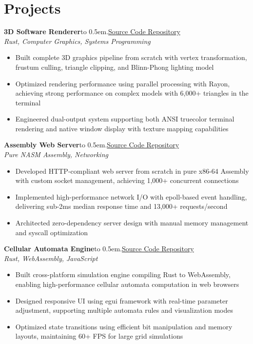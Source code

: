\documentclass[a4paper,10pt]{article}
\newcommand{\projentry}[2]{
  \noindent\textbf{#1}\leaders\hbox to 0.5em{\hss.\hss}\hfill{#2}\\[-0.25em]
}
\begin{document}
\section{Projects}
\projentry{3D Software Renderer}{\href{https://github.com/Liam-Wirth/terminal_renderer}{Source Code Repository}}
\textit{Rust, Computer Graphics, Systems Programming}
\vspace{-0.4em}
\begin{itemize}[noitemsep,parsep=0pt,leftmargin=*]
    \item Built complete 3D graphics pipeline from scratch with vertex transformation, frustum culling, triangle clipping, and Blinn-Phong lighting model
    \item Optimized rendering performance using parallel processing with Rayon, achieving strong performance on complex models with 6,000+ triangles in the terminal
    \item Engineered dual-output system supporting both ANSI truecolor terminal rendering and native window display with texture mapping capabilities
\end{itemize}

\projentry{Assembly Web Server}{\href{https://github.com/Liam-Wirth/asm-webserver}{Source Code Repository}}
\textit{Pure NASM Assembly, Networking}
\vspace{-0.4em}
\begin{itemize}[noitemsep,parsep=0pt,leftmargin=*]
    \item Developed HTTP-compliant web server from scratch in pure x86-64 Assembly with custom socket management, achieving 1,000+ concurrent connections
    \item Implemented high-performance network I/O with epoll-based event handling, delivering sub-2ms median response time and 13,000+ requests/second
    \item Architected zero-dependency server design with manual memory management and syscall optimization
\end{itemize}

\projentry{Cellular Automata Engine}{\href{https://github.com/Liam-Wirth/cellular-automata}{Source Code Repository}}
\textit{Rust, WebAssembly, JavaScript}
\vspace{-0.4em}
\begin{itemize}[noitemsep,parsep=0pt,leftmargin=*]
    \item Built cross-platform simulation engine compiling Rust to WebAssembly, enabling high-performance cellular automata computation in web browsers
    \item Designed responsive UI using egui framework with real-time parameter adjustment, supporting multiple automata rules and visualization modes
    \item Optimized state transitions using efficient bit manipulation and memory layouts, maintaining 60+ FPS for large grid simulations
\end{itemize}
\end{document}
